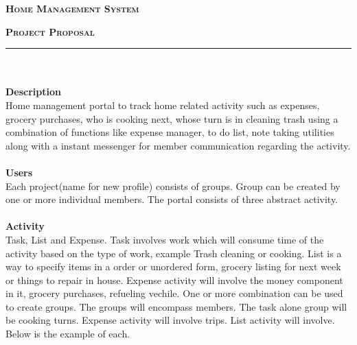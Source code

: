 \documentclass[11]{article}
\newcommand{\HRule}{\rule{\linewidth}{0.3mm}}
\begin{document}
\centerline{\Large \textsc{ \textbf{Home Management System}}} \smallskip
\centerline{\large \textsc{ \textbf{Project Proposal}}} \smallskip
\noindent\HRule \\
\ \\
\textbf{Description} \\
Home management portal to track home related activity such as expenses, grocery purchases, who is cooking next, whose turn is in cleaning trash using a combination of functions like expense manager, to do list, note taking utilities along with a instant messenger for member communication regarding the activity. \\
\ \\
\noindent \textbf{Users} \\
Each project(name for new profile) consists of groups. Group can be created by one or more individual members. The portal consists of three abstract activity.  \\
\ \\
\noindent \textbf{Activity} \\
Task, List and Expense. Task involves work which will consume time of the activity based on the type of work, example Trash cleaning or cooking. List is a way to specify items in a order or unordered form, grocery listing for next week or things to repair in house. Expense activity will involve the money component in it, grocery purchases, refueling vechile. One or more combination can be used to create groups. The groups will encompass members. The task alone group will be cooking turns. Expense activity will involve trips. List activity will involve. Below is the example of each.\\

\begin{minipage}{0.32\textwidth}

\end{minipage}%
\hfill
\begin{minipage}{0.32\textwidth}
\begin{tabular}{|p{\textwidth}}

\end{tabular}
\end{minipage}%
\hfill
\begin{minipage}{0.32\textwidth}
\begin{tabular}{|p{\textwidth}}

\end{tabular}
\end{minipage}%
\end{document}
